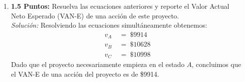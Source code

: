 \documentclass[ a4paper, twoside, 11pt]{article}
\begin{document}
\begin{problem}
\begin{enumerate}[label=\textbf{\alph*)}]
\item \textbf{1.5 Puntos:} Resuelva las ecuaciones anteriores y reporte el Valor Actual Neto Esperado (VAN-E) de una acci\'on de este proyecto. \\[1ex] \emph{Soluci\'on:} Resolviendo las ecuaciones simult\'aneamente obtenemos: 
\begin{align*}
v_A \; & = \; \$9914 \\
v_B \; & = \; \$10628 \\
v_C \; & = \; \$10998
\end{align*}
Dado que el proyecto necesariamente empieza en el estado $A$, concluimos que el VAN-E de una acci\'on del proyecto es de \$9914. 
\end{enumerate}

\end{problem}
\fullskip
\end{document}

